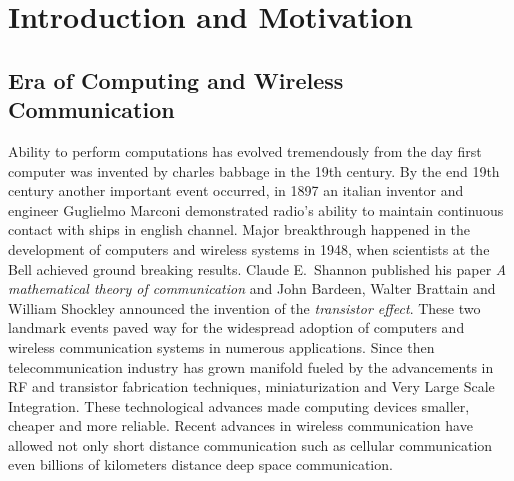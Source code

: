 \chapter{Introduction and Motivation} \label{chap:introduction}

\section{Era of Computing and Wireless Communication}
Ability to perform computations has evolved tremendously from the day first computer was invented by charles babbage in the 19th century. By the end 19th century another important event occurred, in 1897 an italian inventor and engineer Guglielmo Marconi demonstrated radio's ability to maintain continuous contact with ships in english channel. Major breakthrough happened in the development of computers and wireless systems in 1948, when scientists at the Bell achieved ground breaking results. Claude E.~Shannon published his paper \emph{A mathematical theory of communication} and John Bardeen, Walter Brattain and William Shockley announced the invention of the \emph{transistor effect}. These two landmark events paved way for the widespread adoption of computers and wireless communication systems in numerous applications. Since then telecommunication industry has grown manifold fueled by the advancements in RF and transistor fabrication techniques, miniaturization and Very Large Scale Integration. These technological advances made computing devices smaller, cheaper and more reliable. Recent advances in wireless communication have allowed not only short distance communication such as cellular communication even billions of kilometers distance deep space communication. \newline

